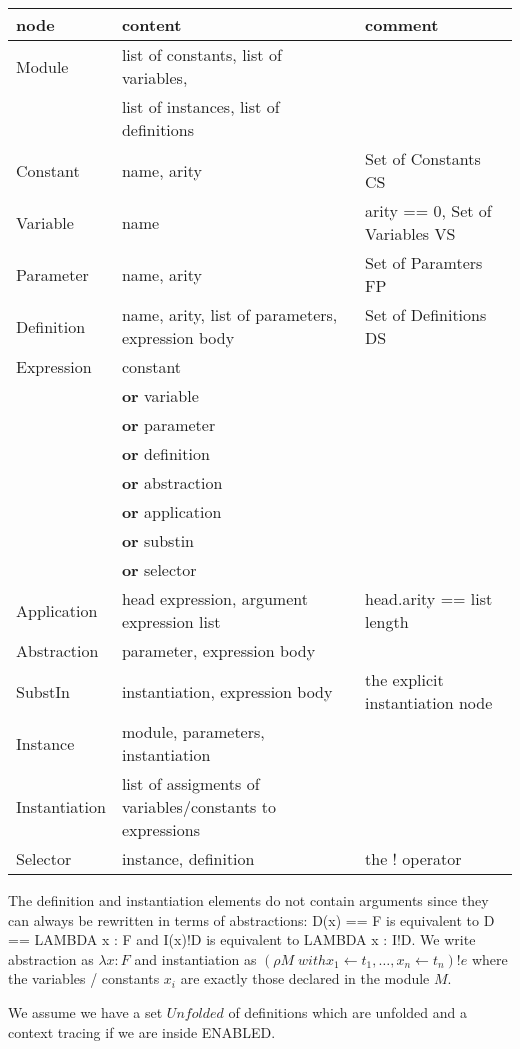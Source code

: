 \documentclass[a4paper]{article}
\newcommand{\dor}{\textbf{or}}
\begin{document}
\begin{tabular}{lll}
node & content & comment \\
\hline
Module & list of constants, list of variables, & \\
       & list of instances, list of definitions & \\
Constant  & name, arity & Set of Constants CS \\
Variable  & name & arity == 0, Set of Variables VS \\
Parameter & name, arity & Set of Paramters FP \\
Definition & name, arity, list of parameters, expression body & Set of Definitions DS\\
Expression  & constant & \\
          & \dor{} variable & \\
          & \dor{} parameter & \\
          & \dor{} definition & \\
          & \dor{} abstraction &\\
          & \dor{} application &\\
          & \dor{} substin & \\
          & \dor{} selector &\\
Application & head expression, argument expression list & head.arity == list length\\
Abstraction & parameter, expression body & \\
SubstIn     & instantiation, expression body & the explicit instantiation node \\
Instance & module, parameters, instantiation & \\
Instantiation & list of assigments of variables/constants to expressions& \\
Selector & instance, definition & the ! operator\\
\end{tabular}

The definition and instantiation elements do not contain arguments since they
 can always be rewritten in terms of abstractions: D(x) == F is equivalent to
 D == LAMBDA x : F and I(x)!D is equivalent to LAMBDA x : I!D. We write
 abstraction as $\lambda x : F$ and instantiation as $(\rho M\; with x_1
 \leftarrow t_1,\ldots,x_n \leftarrow t_n)!e$ where the variables / constants
 $x_i$ are exactly those declared in the module $M$.

We assume we have a set $Unfolded$ of definitions which are unfolded and
 a context tracing if we are inside ENABLED.
\end{document}
